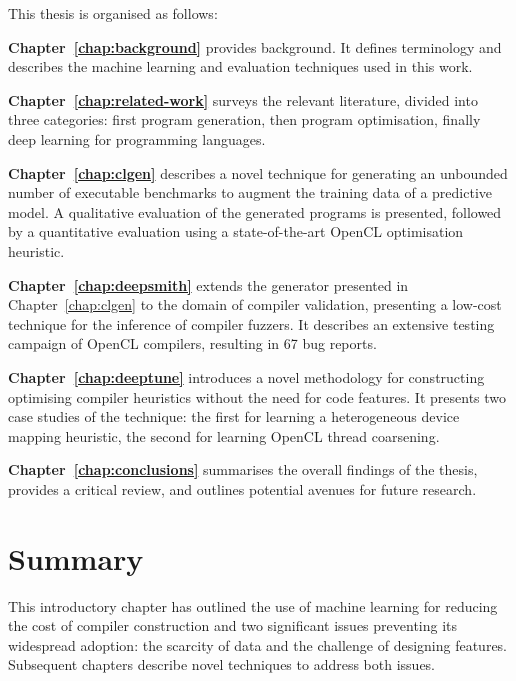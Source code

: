 This thesis is organised as follows:

\textbf{Chapter~\ref{chap:background}} provides background. It defines terminology and describes the machine learning and evaluation techniques used in this work.

\textbf{Chapter~\ref{chap:related-work}} surveys the relevant literature, divided into three categories: first program generation, then program optimisation, finally deep learning for programming languages.

\textbf{Chapter~\ref{chap:clgen}} describes a novel technique for generating an unbounded number of executable benchmarks to augment the training data of a predictive model. A qualitative evaluation of the generated programs is presented, followed by a quantitative evaluation using a state-of-the-art OpenCL optimisation heuristic.

\textbf{Chapter~\ref{chap:deepsmith}} extends the generator presented in Chapter~\ref{chap:clgen} to the domain of compiler validation, presenting a low-cost technique for the inference of compiler fuzzers. It describes an extensive testing campaign of OpenCL compilers, resulting in 67 bug reports.

\textbf{Chapter~\ref{chap:deeptune}} introduces a novel methodology for constructing optimising compiler heuristics without the need for code features. It presents two case studies of the technique: the first for learning a heterogeneous device mapping heuristic, the second for learning OpenCL thread coarsening.

\textbf{Chapter~\ref{chap:conclusions}} summarises the overall findings of the thesis, provides a critical review, and outlines potential avenues for future research.


\section{Summary}

This introductory chapter has outlined the use of machine learning for reducing the cost of compiler construction and two significant issues preventing its widespread adoption: the scarcity of data and the challenge of designing features. Subsequent chapters describe novel techniques to address both issues.
